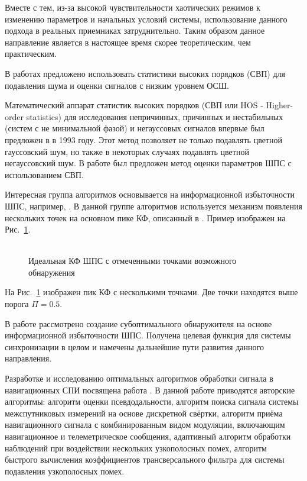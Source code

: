 Вместе с тем, из-за высокой чувствительности хаотических режимов к изменению параметров и начальных условий системы, использование данного подхода
в реальных приемниках затруднительно. Таким образом данное направление является в настоящее время скорее теоретическим, чем практическим.

В работах \cite{hos_petropulu, hos_zhao} предложено использовать статистики высоких порядков (СВП) для подавления шума и оценки
сигналов с низким уровнем ОСШ.

Математический аппарат статистик высоких порядков (СВП или HOS - Higher-order statistics)
для исследования непричинных, причинных и нестабильных
(систем с не минимальной фазой) и негауссовых сигналов впервые был предложен в \cite{hos_petropulu} в 1993 году.
Этот метод позволяет не только подавлять цветной гауссовский шум, но также в некоторых случаях подавлять
цветной негауссовский шум. В работе \cite{hos_zhao} был предложен метод оценки параметров ШПС с использованием СВП.

Интересная группа алгоритмов основывается на информационной избыточности ШПС, например, \cite{phd_che}. В данной
группе алгоритмов используется механизм появления нескольких точек на основном пике КФ, описанный в \cite{kaplan}. Пример
изображен на \mbox{Рис. \ref{pic:sec1_peak_tcd}}.
\begin{figure}[h]
	\center{}
	\caption{\\Идеальная КФ ШПС с отмеченными точками возможного обнаружения}
	\label{pic:sec1_peak_tcd}
\end{figure}

На \mbox{Рис. \ref{pic:sec1_peak_tcd}} изображен пик КФ с несколькими точками. Две точки находятся выше порога ${\Pi=0.5}$.

В работе \cite{phd_che} рассмотрено создание субоптимального обнаружителя на основе информационной избыточности ШПС.
Получена целевая функция для системы синхронизации в целом и намечены дальнейшие пути развития данного направления.

Разработке и исследованию оптимальных алгоритмов обработки сигнала в навигационных СПИ посвящена работа \cite{boldenkov_phd}. В данной работе
приводятся авторские алгоритмы: алгоритм оценки псевдодальности, алгоритм поиска сигнала системы межспутниковых измерений на основе дискретной свёртки,
алгоритм приёма навигационного сигнала с комбинированным видом модуляции, включающим навигационное и телеметрическое сообщения, 
адаптивный алгоритм обработки наблюдений при воздействии нескольких узкополосных помех, алгоритм быстрого вычисления коэффициентов трансверсального
фильтра для системы подавления узкополосных помех.


